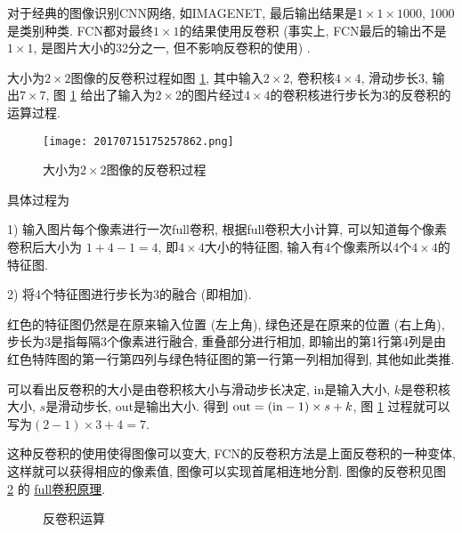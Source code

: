 对于经典的图像识别CNN网络,
如IMAGENET, 最后输出结果是$1\times 1\times 1000$, 1000是类别种类.
FCN都对最终$1\times 1$的结果使用反卷积 (事实上, FCN最后的输出不是$1\times 1$, 是图片大小的32分之一, 但不影响反卷积的使用) .
\begin{example}
大小为$2\times 2$图像的反卷积过程如图 \ref{20170715175257862}, 其中输入$2\times 2$, 卷积核$4\times 4$, 滑动步长3,
输出$7\times 7$, 图 \ref{20170715175257862} 给出了输入为$2\times 2$的图片经过$4\times 4$的卷积核进行步长为3的反卷积的运算过程.
\begin{figure}[H]
    \centering
    \texttt{[image: 20170715175257862.png]}
    \caption{大小为$2\times 2$图像的反卷积过程}
    \label{20170715175257862}
\end{figure}
具体过程为

1) 输入图片每个像素进行一次full卷积, 根据full卷积大小计算, 可以知道每个像素卷积后大小为 $1+4-1=4$, 即$4\times 4$大小的特征图, 输入有4个像素所以4个$4\times 4$的特征图.

2) 将4个特征图进行步长为3的融合 (即相加).

\begin{remark}
    红色的特征图仍然是在原来输入位置 (左上角), 绿色还是在原来的位置 (右上角), 步长为3是指每隔3个像素进行融合,
    重叠部分进行相加, 即输出的第1行第4列是由红色特阵图的第一行第四列与绿色特征图的第一行第一列相加得到, 其他如此类推.
\end{remark}

可以看出反卷积的大小是由卷积核大小与滑动步长决定, in是输入大小, $k$是卷积核大小, $s$是滑动步长, out是输出大小.
得到 $\textup{out} = (\textup{in} - 1) \times  s + k$,
图 \ref{20170715175257862} 过程就可以写为$ (2 - 1)\times 3 + 4 = 7$.
\end{example}
这种反卷积的使用使得图像可以变大, FCN的反卷积方法是上面反卷积的一种变体, 这样就可以获得相应的像素值,
图像可以实现首尾相连地分割. 
图像的反卷积见图 \ref{Dconop0203} 的 \href{https://github.com/vdumoulin/conv_arithmetic}{full卷积原理}.
\vspace{-0.3cm}
\begin{figure}[H]
\centering
{}
\caption{反卷积运算}
\label{Dconop0203}
\end{figure}
